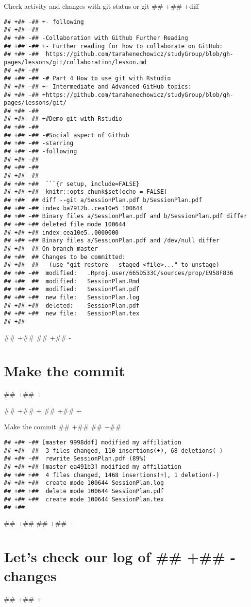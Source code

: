 \documentclass[ignorenonframetext,]{beamer}
\begin{document}
\begin{frame}[fragile]{Check activity and changes with git status or git
## +## +diff}
\begin{verbatim}
## +## -## +- following
## +## -##  
## +## -## -Collaboration with Github Further Reading
## +## -## +- Further reading for how to collaborate on GitHub: 
## +## -##  https://github.com/tarahenechowicz/studyGroup/blob/gh-pages/lessons/git/collaboration/lesson.md
## +## -##  
## +## -## -# Part 4 How to use git with Rstudio
## +## -## +- Intermediate and Advanced GitHub topics:
## +## -## +https://github.com/tarahenechowicz/studyGroup/blob/gh-pages/lessons/git/
## +## -##  
## +## -## +#Demo git with Rstudio
## +## -##  
## +## -## -#Social aspect of Github
## +## -## -starring
## +## -## -following
## +## -##  
## +## -##  
## +## -##  
## +## +##  ```{r setup, include=FALSE}
## +## +##  knitr::opts_chunk$set(echo = FALSE)
## +##  ## diff --git a/SessionPlan.pdf b/SessionPlan.pdf
## +## -## index ba7912b..cea10e5 100644
## +## -## Binary files a/SessionPlan.pdf and b/SessionPlan.pdf differ
## +## +## deleted file mode 100644
## +## +## index cea10e5..0000000
## +## +## Binary files a/SessionPlan.pdf and /dev/null differ
## +##  ## On branch master
## +##  ## Changes to be committed:
## +##  ##   (use "git restore --staged <file>..." to unstage)
## +## -##  modified:   .Rproj.user/665D533C/sources/prop/E958F836
## +##  ##  modified:   SessionPlan.Rmd
## +## -##  modified:   SessionPlan.pdf
## +## +##  new file:   SessionPlan.log
## +## +##  deleted:    SessionPlan.pdf
## +## +##  new file:   SessionPlan.tex
## +##  \end{verbatim}
## +##  
## +## -\section{Make the commit}\label{make-the-commit}
## +## +\end{frame}
## +## +
## +## +\begin{frame}[fragile]{Make the commit}
## +##  
## +##  \begin{verbatim}
## +## -## [master 9998ddf] modified my affiliation
## +## -##  3 files changed, 110 insertions(+), 68 deletions(-)
## +## -##  rewrite SessionPlan.pdf (89%)
## +## +## [master ea491b3] modified my affiliation
## +## +##  4 files changed, 1468 insertions(+), 1 deletion(-)
## +## +##  create mode 100644 SessionPlan.log
## +## +##  delete mode 100644 SessionPlan.pdf
## +## +##  create mode 100644 SessionPlan.tex
## +##  \end{verbatim}
## +##  
## +## -\section{Let's check our log of
## +## -changes}\label{lets-check-our-log-of-changes}
## +## +\end{frame}
\end{document}
